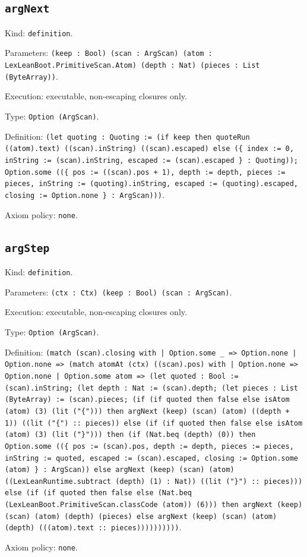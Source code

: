 \documentclass[11pt]{article}
\begin{document}
\subsection*{\texttt{argNext}}
\noindent Kind: \texttt{definition}.\par
\noindent Parameters: \texttt{(keep : Bool) (scan : ArgScan) (atom : LexLeanBoot.PrimitiveScan.Atom) (depth : Nat) (pieces : List (ByteArray))}.\par
\noindent Execution: executable, non-escaping closures only.\par
\noindent Type: \texttt{Option (ArgScan)}.\par
\noindent Definition: \texttt{(let quoting : Quoting := (if keep then quoteRun ((atom).text) ((scan).inString) ((scan).escaped) else (\{ index := 0, inString := (scan).inString, escaped := (scan).escaped \} : Quoting)); Option.some ((\{ pos := ((scan).pos + 1), depth := depth, pieces := pieces, inString := (quoting).inString, escaped := (quoting).escaped, closing := Option.none \} : ArgScan)))}.\par
\noindent Axiom policy: \texttt{none}.\par
\subsection*{\texttt{argStep}}
\noindent Kind: \texttt{definition}.\par
\noindent Parameters: \texttt{(ctx : Ctx) (keep : Bool) (scan : ArgScan)}.\par
\noindent Execution: executable, non-escaping closures only.\par
\noindent Type: \texttt{Option (ArgScan)}.\par
\noindent Definition: \texttt{(match (scan).closing with | Option.some \_ => Option.none | Option.none => (match atomAt (ctx) ((scan).pos) with | Option.none => Option.none | Option.some atom => (let quoted : Bool := (scan).inString; (let depth : Nat := (scan).depth; (let pieces : List (ByteArray) := (scan).pieces; (if (if quoted then false else isAtom (atom) (3) (lit ("\{"))) then argNext (keep) (scan) (atom) ((depth + 1)) ((lit ("\{") :: pieces)) else (if (if quoted then false else isAtom (atom) (3) (lit ("\}"))) then (if (Nat.beq (depth) (0)) then Option.some ((\{ pos := (scan).pos, depth := depth, pieces := pieces, inString := quoted, escaped := (scan).escaped, closing := Option.some (atom) \} : ArgScan)) else argNext (keep) (scan) (atom) ((LexLeanRuntime.subtract (depth) (1) : Nat)) ((lit ("\}") :: pieces))) else (if (if quoted then false else (Nat.beq (LexLeanBoot.PrimitiveScan.classCode (atom)) (6))) then argNext (keep) (scan) (atom) (depth) (pieces) else argNext (keep) (scan) (atom) (depth) (((atom).text :: pieces))))))))))}.\par
\noindent Axiom policy: \texttt{none}.\par
\end{document}
